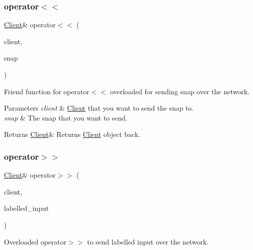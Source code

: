 \subsubsection{\texorpdfstring{operator$<$$<$}{operator<<}}
{\footnotesize\ttfamily \hyperlink{classcp_1_1_client}{Client}\& operator$<$$<$ (\begin{DoxyParamCaption}\item[{\hyperlink{classcp_1_1_client}{Client} \&}]{client,  }\item[{const \hyperlink{classcp_1_1_game_simulator_snap}{Game\+Simulator\+Snap} \&}]{snap }\end{DoxyParamCaption})\hspace{0.3cm}{\ttfamily [friend]}}



Friend function for operator$<$$<$ overloaded for sending snap over the network. 


\begin{DoxyParams}{Parameters}
{\em client} & \hyperlink{classcp_1_1_client}{Client} that you want to send the snap to. \\
\hline
{\em snap} & The snap that you want to send. \\
\hline
\end{DoxyParams}
\begin{DoxyReturn}{Returns}
\hyperlink{classcp_1_1_client}{Client}\& Returns \hyperlink{classcp_1_1_client}{Client} object back. 
\end{DoxyReturn}
\mbox{\label{classcp_1_1_client_a5ad18fedde7ea3af7df0b681df49ab3d}} 
\subsubsection{\texorpdfstring{operator$>$$>$}{operator>>}}
{\footnotesize\ttfamily \hyperlink{classcp_1_1_client}{Client}\& operator$>$$>$ (\begin{DoxyParamCaption}\item[{\hyperlink{classcp_1_1_client}{Client} \&}]{client,  }\item[{key\+\_\+input\+\_\+type \&}]{labelled\+\_\+input }\end{DoxyParamCaption})\hspace{0.3cm}{\ttfamily [friend]}}



Overloaded operator$>$$>$ to send labelled input over the network. 


